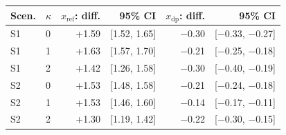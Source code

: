 \begin{tabular}{@{}llrrrr@{}}
\toprule
Scen. & $\kappa$ & $x_{\mathrm{ref}}$: diff. & 95\% CI & $x_{\mathrm{dp}}$: diff. & 95\% CI \\
\midrule
S1 & 0 & +1.59 & [1.52, 1.65] & $-$0.30 & [$-$0.33, $-$0.27] \\
S1 & 1 & +1.63 & [1.57, 1.70] & $-$0.21 & [$-$0.25, $-$0.18] \\
S1 & 2 & +1.42 & [1.26, 1.58] & $-$0.30 & [$-$0.40, $-$0.19] \\
S2 & 0 & +1.53 & [1.48, 1.58] & $-$0.21 & [$-$0.24, $-$0.18] \\
S2 & 1 & +1.53 & [1.46, 1.60] & $-$0.14 & [$-$0.17, $-$0.11] \\
S2 & 2 & +1.30 & [1.19, 1.42] & $-$0.22 & [$-$0.30, $-$0.15] \\
\bottomrule
\end{tabular}

